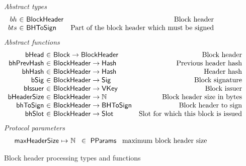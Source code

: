 \documentclass[11pt,a4paper]{article}
\newcommand{\fun}[1]{\mathsf{#1}}
\newcommand{\type}[1]{\mathsf{#1}}
\newcommand{\totalf}{\to}
\newcommand{\partialf}{\mapsto}
\newcommand{\Hash}{\type{Hash}}  %
\newcommand{\Slot}{\type{Slot}}
\newcommand{\Block}{\type{Block}}
\newcommand{\VKey}{\type{VKey}}
\newcommand{\Sig}{\type{Sig}}
\newcommand{\ProtParams}{\type{PParams}} %
\newcommand{\bhdrsizename}{bHeaderSize}
\newcommand{\bsigname}{bSig}
\newcommand{\bissuername}{bIssuer}
\begin{document}
\begin{figure}[ht]
  \emph{Abstract types}
  \begin{equation*}
    \begin{array}{r@{~\in~}lr}
      bh & \Bhead & \text{Block header} \\
      bts & \Bhtosign & \text{Part of the block header which must be signed}
    \end{array}
  \end{equation*}
  \emph{Abstract functions}
  \begin{equation*}
    \begin{array}{r@{~\in~}lr}
      \fun{\bheadname} & \Block \totalf \Bhead & \text{Block header} \\
      \fun{\bhprevhashname} & \Bhead \totalf \Hash & \text{Previous header hash} \\
      \fun{\bhhashname} & \Bhead \totalf \Hash & \text{Header hash} \\
      \fun{\bsigname} & \Bhead \totalf \Sig & \text{Block signature} \\
      \fun{\bissuername} & \Bhead \totalf \VKey & \text{Block issuer} \\
      \fun{\bhdrsizename} & \Bhead \totalf \mathbb{N} & \text{Block header size in bytes}\\
      \fun{\bhtosignname} & \Bhead \totalf \Bhtosign & \text{Block header to sign}\\
      \fun{\bhslotname} & \Bhead \totalf \Slot & \text{Slot for which this block is issued}
    \end{array}
  \end{equation*}
  \emph{Protocol parameters}
  \begin{equation*}
    \begin{array}{r@{~\partialf~}l!{~\in~\ProtParams~}r}
      \maxheadersize & \mathbb{N} & \text{maximum block header size} \\
    \end{array}
  \end{equation*}
  \caption{Block header processing types and functions}
  \label{fig:defs:bhead}
\end{figure}
\end{document}
